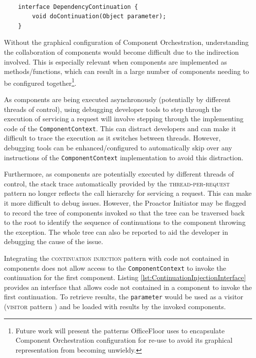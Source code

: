 \documentclass[prodmode]{style/acmlarge}
\begin{document}
\lstset{caption=Injected interface for a dependency to invoke a continuation (making the dependency an Active Object)}
\begin{lstlisting}[float,label=lst:DC_interface]

    interface DependencyContinuation {
        void doContinuation(Object parameter);
    }
\end{lstlisting}

Without the graphical configuration of Component Orchestration, understanding
the collaboration of components would become difficult due to the indirection
involved.  This is especially relevant when components are implemented as
methods/functions, which can result in a large number of components needing to
be configured together\footnote{Future work will present the patterns
OfficeFloor \cite{officefloor} uses to encapsulate Component Orchestration
configuration for re-use to avoid its graphical representation from becoming
unwieldy.}.

As components are being executed asynchronously (potentially by different
threads of control), using debugging developer tools to step through the
execution of servicing a request will involve stepping through the implementing
code of the \texttt{ComponentContext}.  This can distract developers and can
make it difficult to trace the execution as it switches between threads. 
However, debugging tools can be enhanced/configured to automatically skip over any
instructions of the \texttt{ComponentContext} implementation to avoid this
distraction.

Furthermore, as components are potentially executed by different threads of
control, the stack trace automatically provided by the
\textsc{thread-per-request} pattern no longer reflects the call hierarchy for
servicing a request.  This can make it more difficult to debug issues.  However,
the Proactor Initiator may be flagged to record the tree of components invoked
so that the tree can be traversed back to the root to identify the sequence of
continuations to the component throwing the exception.  The whole tree can also
be reported to aid the developer in debugging the cause of the issue.

Integrating the \textsc{continuation injection} pattern with code not contained
in components does not allow access to the \texttt{ComponentContext} to invoke
the continuation for the first component.  Listing
\ref{lst:ContinuationInjectionInterface} provides an interface that allows code
not contained in a component to invoke the first continuation.  To retrieve
results, the \texttt{parameter} would be used as a visitor (\textsc{visitor}
pattern \cite{gof}) and be loaded with results by the invoked components.
\end{document}
